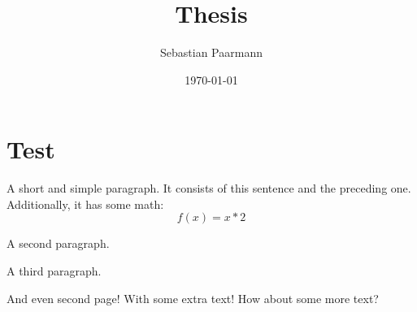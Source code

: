 \documentclass{article}
\title{Thesis}
\author{Sebastian Paarmann}
\date\today
\begin{document}
\maketitle

\section{Test}

A short and simple paragraph. It consists of this sentence and the preceding one. Additionally, it has some math:
\[
	f(x) = x * 2
\]


A second paragraph.

A third paragraph.


\newpage

And even second page! With some extra text! How about some more text?
\end{document}
